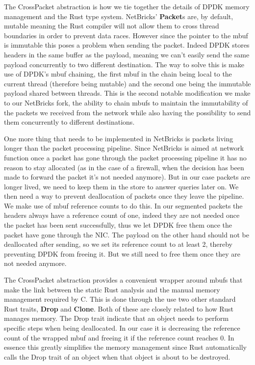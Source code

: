 

The CrossPacket abstraction is how we tie together the details of DPDK
memory management and the Rust type system. NetBricks'
\textbf{Packet}s are, by default, mutable meaning the Rust compiler
will not allow them to cross thread boundaries in order to prevent
data races. However since the pointer to the mbuf is immutable this
poses a problem when sending the packet. Indeed DPDK stores headers in
the same buffer as the payload, meaning we can't easily send the same
payload concurrently to two different destination. The way to solve
this is make use of DPDK's mbuf chaining, the first mbuf in the chain
being local to the current thread (therefore being mutable) and the
second one being the immutable payload shared between threads. This is
the second notable modification we make to our NetBricks fork, the
ability to chain mbufs to maintain the immutability of the packets we
received from the network while also having the possibility to send
them concurrently to different destinations.

One more thing that needs to be implemented in NetBricks is packets
living longer than the packet processing pipeline. Since NetBricks is
aimed at network function once a packet has gone through the packet
processing pipeline it has no reason to stay allocated (as in the case
of a firewall, when the decision has been made to forward the packet
it's not needed anymore). But in our case packets are longer lived, we
need to keep them in the store to answer queries later on. We then
need a way to prevent deallocation of packets once they leave the
pipeline. We make use of mbuf reference counts to do this. In our
segmented packets the headers always have a reference count of one,
indeed they are not needed once the packet has been sent successfully,
thus we let DPDK free them once the packet have gone through the
NIC\@. The payload on the other hand should not be deallocated after
sending, so we set its reference count to at least 2, thereby
preventing DPDK from freeing it. But we still need to free them once
they are not needed anymore.

The CrossPacket abstraction provides a convenient wrapper around mbufs
that make the link between the static Rust analysis and the manual
memory management required by C. This is done through the use two
other standard Rust traits, \textbf{Drop} and \textbf{Clone}.
Both of these are closely related to how Rust manages memory. The Drop
trait indicate that an object needs to perform specific steps when
being deallocated. In our case it is decreasing the reference count of
the wrapped mbuf and freeing it if the reference count reaches 0. In
essence this greatly simplifies the memory management since Rust
automatically calls the Drop trait of an object when that object
is about to be destroyed.

